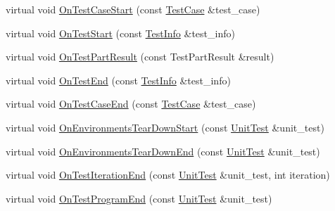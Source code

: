 \begin{DoxyCompactItemize}
\item 
virtual void \mbox{\hyperlink{classtesting_1_1internal_1_1_test_event_repeater_a70124c738caa338bcd723eb2a51c8b3e}{On\+Test\+Case\+Start}} (const \mbox{\hyperlink{classtesting_1_1_test_case}{Test\+Case}} \&test\+\_\+case)
\item 
virtual void \mbox{\hyperlink{classtesting_1_1internal_1_1_test_event_repeater_a70d694ca5010cc86cd458f7f529e6fbe}{On\+Test\+Start}} (const \mbox{\hyperlink{classtesting_1_1_test_info}{Test\+Info}} \&test\+\_\+info)
\item 
virtual void \mbox{\hyperlink{classtesting_1_1internal_1_1_test_event_repeater_ac8fb21da6802b1ebab9cad3eee9150eb}{On\+Test\+Part\+Result}} (const Test\+Part\+Result \&result)
\item 
virtual void \mbox{\hyperlink{classtesting_1_1internal_1_1_test_event_repeater_aa0f13bded9369aae1c78583d7276f8b1}{On\+Test\+End}} (const \mbox{\hyperlink{classtesting_1_1_test_info}{Test\+Info}} \&test\+\_\+info)
\item 
virtual void \mbox{\hyperlink{classtesting_1_1internal_1_1_test_event_repeater_a0a335e1c3957a8c699ed56e37ea7b978}{On\+Test\+Case\+End}} (const \mbox{\hyperlink{classtesting_1_1_test_case}{Test\+Case}} \&test\+\_\+case)
\item 
virtual void \mbox{\hyperlink{classtesting_1_1internal_1_1_test_event_repeater_a30db75df2d9a65d787f31e16004613c2}{On\+Environments\+Tear\+Down\+Start}} (const \mbox{\hyperlink{classtesting_1_1_unit_test}{Unit\+Test}} \&unit\+\_\+test)
\item 
virtual void \mbox{\hyperlink{classtesting_1_1internal_1_1_test_event_repeater_a8428220c4cf9f0cea2dfd9a70f07ab7f}{On\+Environments\+Tear\+Down\+End}} (const \mbox{\hyperlink{classtesting_1_1_unit_test}{Unit\+Test}} \&unit\+\_\+test)
\item 
virtual void \mbox{\hyperlink{classtesting_1_1internal_1_1_test_event_repeater_a0e696d3c93a9f45fcf7142555fecad35}{On\+Test\+Iteration\+End}} (const \mbox{\hyperlink{classtesting_1_1_unit_test}{Unit\+Test}} \&unit\+\_\+test, int iteration)
\item 
virtual void \mbox{\hyperlink{classtesting_1_1internal_1_1_test_event_repeater_a4622616259747dbcc23f5ee39ef99ec0}{On\+Test\+Program\+End}} (const \mbox{\hyperlink{classtesting_1_1_unit_test}{Unit\+Test}} \&unit\+\_\+test)
\end{DoxyCompactItemize}
